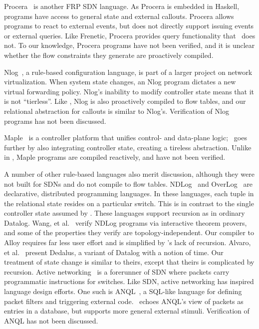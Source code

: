 Procera~\cite{voellmy:hotsdn12-procera} is another
FRP SDN language. As Procera is embedded in Haskell, programs have access to
general state and external callouts. Procera allows
programs to react to external events, but does not directly support
issuing events or external queries. Like Frenetic, Procera
provides query functionality that \flowlog\ does not. To
our knowledge, Procera programs have not been verified, and it
is unclear whether the flow constraints they generate are proactively compiled.

Nlog~\cite{koponen++:nsdi14-vmware-nlog}, a rule-based
configuration language, is part of a larger project on network
virtualization. When system state changes, an Nlog program dictates a new
virtual forwarding policy. Nlog's inability to modify controller
state means that it is not ``tierless''. Like \flowlog, Nlog is also proactively compiled
to flow tables, and our relational abstraction for callouts is similar to Nlog's. 
Verification of Nlog programs has not been discussed.

Maple~\cite{voellmy:sigcomm13-maple} is a controller platform that unifies control-
and data-plane logic; \flowlog\ goes further by also integrating controller state,
creating a tireless abstraction. Unlike in \flowlog, Maple programs are compiled
reactively, and have not been verified.


A number of other rule-based languages also merit discussion, although
they were not built for SDNs and do not compile to flow tables. 
NDLog~\cite{loo:commacm09-declarative-networking} and OverLog~\cite{blt+:sosp05-overlog} are
declarative, distributed programming languages. In these languages, each tuple in the
relational state resides on a particular switch.
This is in contrast to the single controller state assumed by
\flowlog. These languages support recursion as in ordinary Datalog. Wang, et
al.~\cite{wang+:padl09-declarative-network-verif} verify NDLog programs via
interactive theorem provers, and some of the properties they verify are
topology-independent. Our compiler to Alloy requires far less user
effort and is simplified by \flowlog's lack of recursion. 
Alvaro, et al.~\cite{alvaro:datalog10-dedalus} present Dedalus, a variant of
Datalog with a notion of time. Our treatment of state change
is similar to theirs, except that theirs is complicated by recursion. 
Active networking~\cite{tennenhouse:ieeecommmag97-activenetworks} is a
forerunner of SDN where packets carry programmatic instructions for switches.
Like SDN, active networking has inspired language design efforts. One such is
ANQL~\cite{rogers:iwan02-anql}, a SQL-like language for defining packet
filters and triggering external code. \flowlog\ echoes ANQL's view of packets
as entries in a database, but supports more general external
stimuli. Verification of ANQL has not been discussed.

